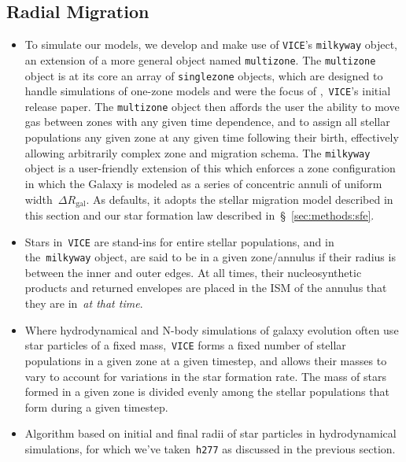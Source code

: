 \documentclass[fleqn, usenatbib]{mnras}
\begin{document}
\subsection{Radial Migration} 
\label{sec:methods:migration} 
\begin{itemize} 
	\item To simulate our models, we develop and make use of \texttt{VICE}'s 
	\texttt{milkyway} object, an extension of a more general object named 
	\texttt{multizone}. The \texttt{multizone} object is at its core an array 
	of \texttt{singlezone} objects, which are designed to handle 
	simulations of one-zone models and were the focus of 
	\citet{Johnson2020},~\texttt{VICE}'s initial release paper. The 
	\texttt{multizone} object then affords the user the ability to move 
	gas between zones with any given time dependence, and to assign all 
	stellar populations any given zone at any given time following their 
	birth, effectively allowing arbitrarily complex zone and migration 
	schema. The \texttt{milkyway} object is a user-friendly extension of this 
	which enforces a zone configuration in which the Galaxy is modeled as a 
	series of concentric annuli of uniform width~$\Delta R_\text{gal}$. As 
	defaults, it adopts the stellar migration model described in this section 
	and our star formation law described in~\S~\ref{sec:methods:sfe}. 

	\item Stars in~\texttt{VICE} are stand-ins for entire stellar 
	populations, and in the~\texttt{milkyway} object, are said to be in a 
	given zone/annulus if their radius is between the inner and outer 
	edges. At all times, their nucleosynthetic products and returned envelopes 
	are placed in the ISM of the annulus that they are in~\textit{at that 
	time}. 

	\item Where hydrodynamical and N-body simulations of galaxy evolution 
	often use star particles of a fixed mass,~\texttt{VICE} forms a fixed 
	number of stellar populations in a given zone at a given timestep, 
	and allows their masses to vary to account for variations in the star 
	formation rate. The mass of stars formed in a given zone is divided 
	evenly among the stellar populations that form during a given 
	timestep. 

	\item Algorithm based on initial and final radii of star particles in 
	hydrodynamical simulations, for which we've taken~\texttt{h277} as 
	discussed in the previous section. 


\end{itemize}
\end{document}

